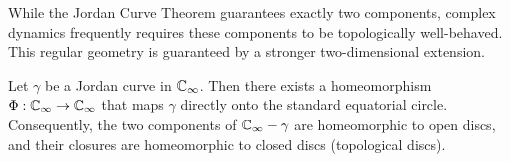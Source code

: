 While the Jordan Curve Theorem guarantees exactly two components, complex
dynamics frequently requires these components to be topologically well-behaved.
This regular geometry is guaranteed by a stronger two-dimensional extension.

\begin{theorem*}
    Let $\gamma$ be a Jordan curve in $\mathbb{C}_\infty$. Then there exists a homeomorphism
    $\Phi: \mathbb{C}_\infty \to \mathbb{C}_\infty$ that maps $\gamma$ directly onto the standard
    equatorial circle. Consequently, the two components of $\mathbb{C}_\infty - \gamma$
    are homeomorphic to open discs, and their closures are homeomorphic to closed
    discs (topological discs).
\end{theorem*}

\tableofcontents